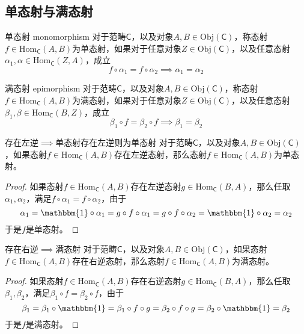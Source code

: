 \subsection{单态射与满态射}

\begin{definition}{单态射 monomorphism}
	对于范畴$\mathsf{C}$，以及对象$A,B\in\mathrm{Obj}(\mathsf{C})$，称态射$f\in\mathrm{Hom}_\mathsf{C}(A,B)$为单态射，如果对于任意对象$Z\in\mathrm{Obj}(\mathsf{C})$，以及任意态射$\alpha_1,\alpha\in\mathrm{Hom}_\mathsf{C}(Z,A)$，成立
	$$
	f\circ \alpha_1=f\circ \alpha_2
	\implies
	\alpha_1=\alpha_2
	$$
\end{definition}

\begin{definition}{满态射 epimorphism}
	对于范畴$\mathsf{C}$，以及对象$A,B\in\mathrm{Obj}(\mathsf{C})$，称态射$f\in\mathrm{Hom}_\mathsf{C}(A,B)$为满态射，如果对于任意对象$Z\in\mathrm{Obj}(\mathsf{C})$，以及任意态射$\beta_1,\beta\in\mathrm{Hom}_\mathsf{C}(B,Z)$，成立
	$$
	\beta_1\circ f=\beta_2\circ f
	\implies
	\beta_1=\beta_2
	$$
\end{definition}

\begin{proposition}{存在左逆$\implies$单态射}{存在左逆则为单态射}
	对于范畴$\mathsf{C}$，以及对象$A,B\in\mathrm{Obj}(\mathsf{C})$，如果态射$f\in\mathrm{Hom}_\mathsf{C}(A,B)$存在左逆态射，那么态射$f\in\mathrm{Hom}_\mathsf{C}(A,B)$为单态射。
\end{proposition}

\begin{proof}
	如果态射$f\in\mathrm{Hom}_\mathsf{C}(A,B)$存在左逆态射$g\in\mathrm{Hom}_\mathsf{C}(B,A)$，那么任取$\alpha_1,\alpha_2$，满足$f\circ \alpha_1=f\circ \alpha_2$，由于
	$$
	\alpha_1=\mathbbm{1}\circ \alpha_1=g\circ f\circ \alpha_1=g\circ f\circ \alpha_2=\mathbbm{1}\circ \alpha_2=\alpha_2
	$$
	于是$f$是单态射。
\end{proof}

\begin{proposition}{存在右逆$\implies$满态射}
	对于范畴$\mathsf{C}$，以及对象$A,B\in\mathrm{Obj}(\mathsf{C})$，如果态射$f\in\mathrm{Hom}_\mathsf{C}(A,B)$存在右逆态射，那么态射$f\in\mathrm{Hom}_\mathsf{C}(A,B)$为满态射。
\end{proposition}

\begin{proof}
	如果态射$f\in\mathrm{Hom}_\mathsf{C}(A,B)$存在右逆态射$g\in\mathrm{Hom}_\mathsf{C}(B,A)$，那么任取$\beta_1,\beta_2$，满足$\beta_1\circ f=\beta_2\circ f$，由于
	$$
	\beta_1=\beta_1\circ \mathbbm{1}=\beta_1\circ f\circ g=\beta_2\circ f\circ g=\beta_2\circ \mathbbm{1}=\beta_2
	$$
	于是$f$是满态射。
\end{proof}

